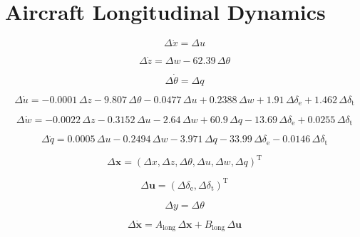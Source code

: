 \documentclass[lettersize,journal]{IEEEtran}
\begin{document}
{\newpage

\section{Aircraft Longitudinal Dynamics}\label{apdx:long_dyn}

\begin{equation}
\Delta \dot{x}=\Delta u
\end{equation}

\begin{equation}
\Delta \dot{z}=\Delta w-62.39\,\Delta \theta
\end{equation}

\begin{equation}
\Delta \dot{\theta }=\Delta q
\end{equation}

\begin{equation}
\Delta \dot{u}=-0.0001\,\Delta z -9.807\,\Delta \theta -0.0477\,\Delta u+0.2388\,\Delta w+ 1.91\,\Delta \delta _{\mathrm{e}}+1.462\,\Delta \delta _{\mathrm{t}}
\end{equation}

\begin{equation}
\Delta \dot{w}=-0.0022\,\Delta z-0.3152\,\Delta u-2.64\,\Delta w+60.9\,\Delta q-13.69\,\Delta \delta _{\mathrm{e}}+0.0255\,\Delta \delta _{\mathrm{t}}
\end{equation}

\begin{equation}
\Delta \dot{q}=0.0005\,\Delta u-0.2494\,\Delta w-3.971\,\Delta q-33.99\,\Delta \delta _{\mathrm{e}}-0.0146\,\Delta \delta _{\mathrm{t}}
\end{equation}

\begin{equation}
\Delta \bm{x} = (\Delta x, \Delta z, \Delta \theta, \Delta u, \Delta w, \Delta q)^{\mathrm{T}}
\end{equation}

\begin{equation}
\Delta \bm{u} = (\Delta \delta _{\mathrm{e}}, \Delta \delta _{\mathrm{t}})^{\mathrm{T}}
\end{equation}

\begin{equation}
\Delta y = \Delta \theta
\end{equation}

\begin{equation}
\Delta \bm{\dot{x}} = A_{\mathrm{long}}\,\Delta\bm{x} + B_{\mathrm{long}}\,\Delta\bm{u}
\end{equation}

}
\end{document}
